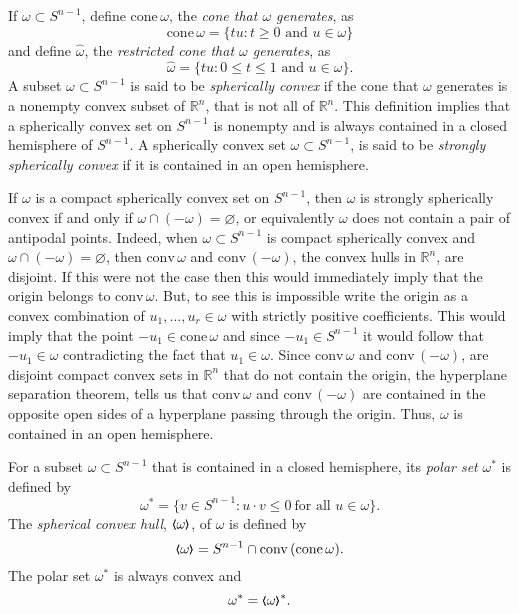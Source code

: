 \documentclass{cpamart1}     %
\theoremstyle{definition}
\theoremstyle{remark}
\newcommand{\rn}{\mathbb R^n}
\newcommand{\sn}{S^{n-1}}
\newcommand{\bla}{\raise.2ex\hbox{$\scriptstyle\pmb \langle$}}
\newcommand{\bra}{\raise.2ex\hbox{$\scriptstyle\pmb \rangle$}}
\begin{document}
If $\omega \subset S^{n-1}$, define $\text{cone}\,\omega $,
the {\it cone that $\omega $ generates}, as
\[
\text{cone}\,\omega = \{tu:\text{$t\ge 0$ and $u\in\omega$}\}
\]
and define $\hat \omega$, the {\it restricted cone that $\omega $ generates}, as
\[
\hat \omega =
\{tu : \text{$0\le t \le 1$ and $u\in \omega$}  \}.
\]
A subset $\omega \subset S^{n-1}$ is said to be {\it spherically convex} if the
cone that $\omega $ generates is a nonempty convex subset of $\rn$,
that is not all of $\rn$.
This definition implies that
 a spherically convex set on $\sn$ is nonempty and
 is always contained in a closed hemisphere of $\sn$.
A spherically convex set $\omega\subset S^{n-1}$, is said to be {\it strongly spherically convex}
if it is contained in an open hemisphere.

If $\omega$ is a compact spherically convex set on $\sn$, then $\omega$
is strongly spherically convex
if and only if $\omega\cap(-\omega)=\varnothing$, or equivalently $\omega$
does not contain a pair of antipodal points.
Indeed, when $\omega\subset \sn$
is compact spherically convex and
$\omega\cap(-\omega)=\varnothing$, then  $\text{conv}\, \omega$ and
$\text{conv}\, (-\omega)$, the convex hulls in $\rn$, are disjoint. If this
were not the case then this would immediately imply that the origin belongs to $\text{conv}\, \omega$.
But, to see this is impossible write the origin as a convex combination of
$u_1,\ldots,u_r\in \omega$ with strictly positive coefficients. This would imply that the point $-u_1 \in \text{cone}\,\omega$ and since $-u_1\in\sn$ it
would follow that $-u_1\in\omega$ contradicting the fact that $u_1\in\omega$.
Since  $\text{conv}\, \omega$ and
$\text{conv}\, (-\omega)$,
are disjoint compact convex sets in $\rn$ that do not contain the origin,
the hyperplane separation theorem,  tells us that $\text{conv}\, \omega$ and
$\text{conv}\, (-\omega)$ are contained in the opposite open sides of a hyperplane passing
through the origin. Thus, $\omega$ is contained in an open hemisphere.



For a subset $\omega\subset S^{n-1}$ that is contained in a closed hemisphere,
its {\it polar set} $\omega^*$ is defined by
\begin{equation*}
\omega^* =\{v\in S^{n-1} : u\cdot v\leq 0\ \text{for all } u\in\omega\}.
\end{equation*}
The {\it spherical convex hull}, $\bla \omega \bra$, of $\omega$ is defined by
\[
\bla \omega \bra =\sn\cap\text{conv}\,(\text{cone}\,\omega).
\]
The polar set $\omega^*$ is always convex and
\begin{equation}
\label{yz2}
\omega^* = \bla \omega \bra^*.
\end{equation}
\end{document}
